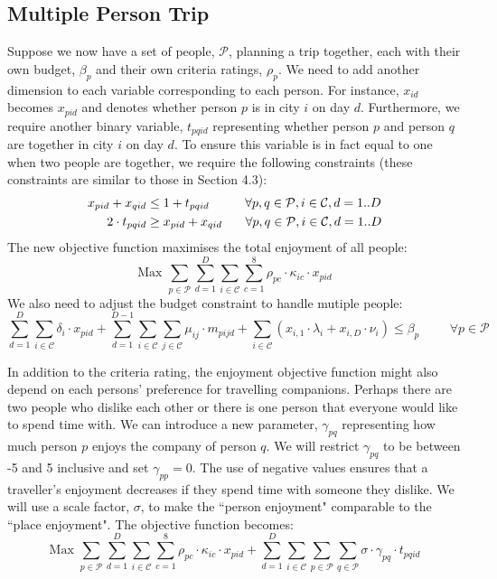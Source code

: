 \documentclass[12pt]{article}
\begin{document}
\subsection{Multiple Person Trip}
Suppose we now have a set of people, $\mathcal{P}$, planning a trip together, each with their own budget, $\beta_{p}$ and their own criteria ratings, $\rho_{p}$. We need to add another dimension to each variable corresponding to each person. For instance, $x_{id}$ becomes $x_{pid}$ and denotes whether person $p$ is in city $i$ on day $d$. Furthermore, we require another binary variable, $t_{pqid}$ representing whether person $p$ and person $q$ are together in city $i$ on day $d$. To ensure this variable is in fact equal to one when two people are together, we require the following constraints (these constraints are similar to those in Section 4.3):
\begin{align*}
x_{pid} + x_{qid} &\leq 1 + t_{pqid} \hspace{1cm} \forall p,q \in \mathcal{P}, i \in \mathcal{C}, d=1..D \\
2\cdot t_{pqid} &\geq x_{pid} + x_{qid} \hspace{6.5mm} \forall p,q \in \mathcal{P}, i \in \mathcal{C}, d=1..D 
\end{align*}
The new objective function maximises the total enjoyment of all people:
\begin{equation*}
\text{Max   } \sum_{p \in \mathcal{P}} \sum_{d=1}^{D} \sum_{i \in \mathcal{C}} \sum_{c=1}^{8} \rho_{pc} \cdot \kappa_{ic} \cdot x_{pid}
\end{equation*}
We also need to adjust the budget constraint to handle mutiple people:
\begin{equation*}
\sum_{d=1}^{D} \sum_{i \in \mathcal{C}} \delta_{i} \cdot x_{pid} + \sum_{d=1}^{D-1} \sum_{i \in \mathcal{C}} \sum_{j \in \mathcal{C}} \mu_{ij} \cdot m_{pijd}+ \sum_{i \in \mathcal{C}} \left( x_{i,1} \cdot \lambda_{i} + x_{i,D} \cdot \nu_{i} \right) \leq \beta_{p} \hspace{1cm} \forall p \in \mathcal{P}
\end{equation*}

In addition to the criteria rating, the enjoyment objective function might also depend on each persons' preference for travelling companions. Perhaps there are two people who dislike each other or there is one person that everyone would like to spend time with. We can introduce a new parameter, $\gamma_{pq}$ representing how much person $p$ enjoys the company of person $q$. We will restrict $\gamma_{pq}$ to be between -5 and 5 inclusive and set $\gamma_{pp}=0$. The use of negative values ensures that a traveller's enjoyment decreases if they spend time with someone they dislike. We will use a scale factor, $\sigma$, to make the ``person enjoyment" comparable to the ``place enjoyment". The objective function becomes:
\begin{equation*}
\text{Max   } \sum_{p \in \mathcal{P}} \sum_{d=1}^{D} \sum_{i \in \mathcal{C}} \sum_{c=1}^{8} \rho_{pc} \cdot \kappa_{ic} \cdot x_{pid} + \sum_{d=1}^{D} \sum_{i \in \mathcal{C}} \sum_{p \in \mathcal{P}} \sum_{q \in \mathcal{P}} \sigma \cdot \gamma_{pq} \cdot t_{pqid}
\end{equation*}
\end{document}
